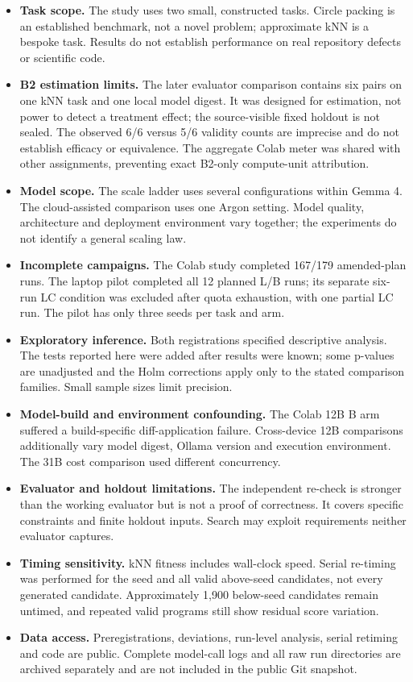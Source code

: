 \documentclass[11pt]{article}
\begin{document}
\begin{itemize}
\item \textbf{Task scope.} The study uses two small, constructed tasks. Circle packing is an established benchmark, not a novel problem; approximate kNN is a bespoke task. Results do not establish performance on real repository defects or scientific code.
\item \textbf{B2 estimation limits.} The later evaluator comparison contains six pairs on one kNN task and one local model digest. It was designed for estimation, not power to detect a treatment effect; the source-visible fixed holdout is not sealed. The observed 6/6 versus 5/6 validity counts are imprecise and do not establish efficacy or equivalence. The aggregate Colab meter was shared with other assignments, preventing exact B2-only compute-unit attribution.
\item \textbf{Model scope.} The scale ladder uses several configurations within Gemma 4. The cloud-assisted comparison uses one Argon setting. Model quality, architecture and deployment environment vary together; the experiments do not identify a general scaling law.
\item \textbf{Incomplete campaigns.} The Colab study completed 167/179 amended-plan runs. The laptop pilot completed all 12 planned L/B runs; its separate six-run LC condition was excluded after quota exhaustion, with one partial LC run. The pilot has only three seeds per task and arm.
\item \textbf{Exploratory inference.} Both registrations specified descriptive analysis. The tests reported here were added after results were known; some p-values are unadjusted and the Holm corrections apply only to the stated comparison families. Small sample sizes limit precision.
\item \textbf{Model-build and environment confounding.} The Colab 12B B arm suffered a build-specific diff-application failure. Cross-device 12B comparisons additionally vary model digest, Ollama version and execution environment. The 31B cost comparison used different concurrency.
\item \textbf{Evaluator and holdout limitations.} The independent re-check is stronger than the working evaluator but is not a proof of correctness. It covers specific constraints and finite holdout inputs. Search may exploit requirements neither evaluator captures.
\item \textbf{Timing sensitivity.} kNN fitness includes wall-clock speed. Serial re-timing was performed for the seed and all valid above-seed candidates, not every generated candidate. Approximately 1,900 below-seed candidates remain untimed, and repeated valid programs still show residual score variation.
\item \textbf{Data access.} Preregistrations, deviations, run-level analysis, serial retiming and code are public. Complete model-call logs and all raw run directories are archived separately and are not included in the public Git snapshot.
\end{itemize}
\end{document}

